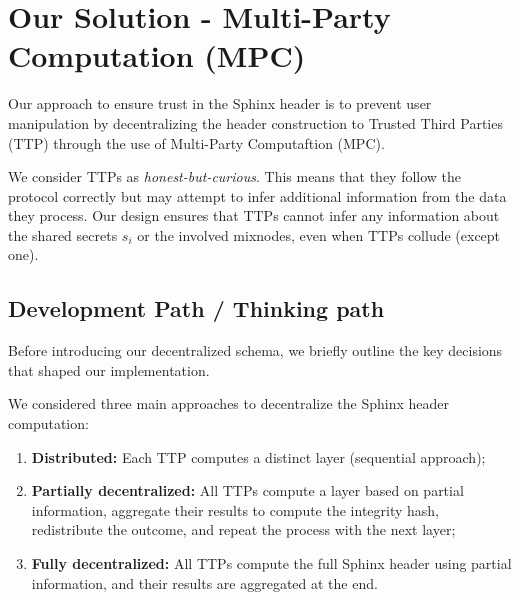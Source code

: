 \newpage
\section{Our Solution - Multi-Party Computation (MPC)}\label{sec:scheme}

Our approach to ensure trust in the Sphinx header is to prevent user manipulation by decentralizing the header construction to Trusted Third Parties (TTP) through the use of Multi-Party Computaftion (MPC).
\newline

We consider TTPs as \textit{honest-but-curious}.
This means that they follow the protocol correctly but may attempt to infer additional information from the data they process.
Our design ensures that TTPs cannot infer any information about the shared secrets $ s_i $ or the involved mixnodes, even when TTPs collude (except one).

\subsection{Development Path / Thinking path}

Before introducing our decentralized schema, we briefly outline the key decisions that shaped our implementation.
\newline

\noindent We considered three main approaches to decentralize the Sphinx header computation:
\begin{enumerate}
    \item \textbf{Distributed:} Each TTP computes a distinct layer (sequential approach);
    \item \textbf{Partially decentralized:} All TTPs compute a layer based on partial information, aggregate their results to compute the integrity hash, redistribute the outcome, and repeat the process with the next layer;
    \item \textbf{Fully decentralized:} All TTPs compute the full Sphinx header using partial information, and their results are aggregated at the end.
\end{enumerate}


